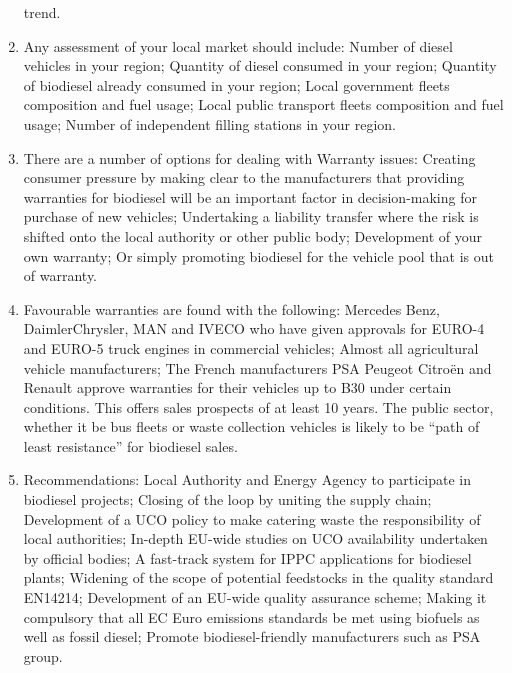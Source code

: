 \documentclass[11pt,fleqn,oneside]{book} %
\begin{document}
\begin{enumerate}
	trend.
	\item Any assessment of your local market should include: Number of diesel vehicles in your
	region; Quantity of diesel consumed in your region; Quantity of biodiesel already
	consumed in your region; Local government fleets composition and fuel usage; Local
	public transport fleets composition and fuel usage; Number of independent filling stations
	in your region.
	\item There are a number of options for dealing with Warranty issues: Creating consumer
	pressure by making clear to the manufacturers that providing warranties for biodiesel will
	be an important factor in decision-making for purchase of new vehicles; Undertaking a
	liability transfer where the risk is shifted onto the local authority or other public body;
	Development of your own warranty; Or simply promoting biodiesel for the vehicle pool
	that is out of warranty.
	\item Favourable warranties are found with the following: Mercedes Benz, DaimlerChrysler,
	MAN and IVECO who have given approvals for EURO-4 and EURO-5 truck engines in
	commercial vehicles; Almost all agricultural vehicle manufacturers; The French
	manufacturers PSA Peugeot Citroën and Renault approve warranties for their vehicles up
	to B30 under certain conditions. This offers sales prospects of at least 10 years. The
	public sector, whether it be bus fleets or waste collection vehicles is likely to be “path of
	least resistance” for biodiesel sales.
	\item Recommendations: Local Authority and Energy Agency to participate in biodiesel
	projects; Closing of the loop by uniting the supply chain; Development of a UCO policy to
	make catering waste the responsibility of local authorities; In-depth EU-wide studies on
	UCO availability undertaken by official bodies; A fast-track system for IPPC applications
	for biodiesel plants; Widening of the scope of potential feedstocks in the quality standard
	EN14214; Development of an EU-wide quality assurance scheme; Making it compulsory
	that all EC Euro emissions standards be met using biofuels as well as fossil diesel;
	Promote biodiesel-friendly manufacturers such as PSA group.
\end{enumerate}



\end{document}
